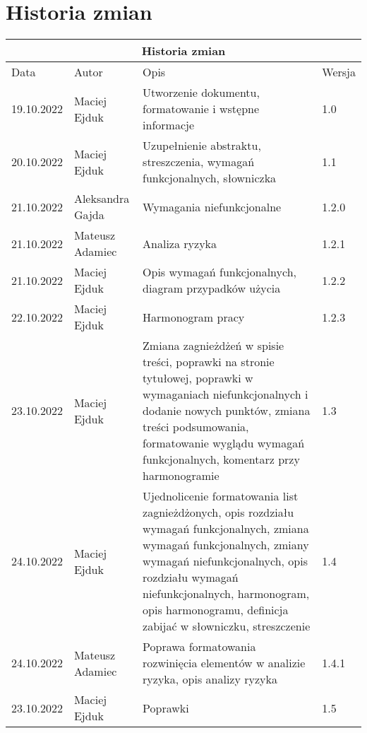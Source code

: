 \chapter{Historia zmian}

\begin{center}
    \begin{longtable}{ |l|l|p{6cm}|l|  }
        \hline
        \multicolumn{4}{|c|}{Historia zmian} \\
        \hline
        Data & Autor & Opis & Wersja\\
        \hline
        19.10.2022 & Maciej Ejduk & Utworzenie dokumentu, formatowanie i wstępne informacje & 1.0\\
        \hline
        20.10.2022 & Maciej Ejduk & Uzupełnienie abstraktu, streszczenia, wymagań funkcjonalnych, słowniczka & 1.1\\
        \hline
        21.10.2022 & Aleksandra Gajda & Wymagania niefunkcjonalne & 1.2.0\\
        \hline
        21.10.2022 & Mateusz Adamiec & Analiza ryzyka & 1.2.1\\
        \hline
        21.10.2022 & Maciej Ejduk & Opis wymagań funkcjonalnych, diagram przypadków użycia & 1.2.2\\
        \hline
        22.10.2022 & Maciej Ejduk & Harmonogram pracy & 1.2.3\\
        \hline
        23.10.2022 & Maciej Ejduk & Zmiana zagnieżdżeń w spisie treści, poprawki na stronie tytułowej, poprawki w wymaganiach niefunkcjonalnych i dodanie nowych punktów, zmiana treści podsumowania, formatowanie wyglądu wymagań funkcjonalnych, komentarz przy harmonogramie & 1.3\\
        \hline
        24.10.2022 & Maciej Ejduk & Ujednolicenie formatowania list zagnieżdżonych, opis rozdziału wymagań funkcjonalnych, zmiana wymagań funkcjonalnych, zmiany wymagań niefunkcjonalnych, opis rozdziału wymagań niefunkcjonalnych, harmonogram, opis harmonogramu, definicja zabijać w słowniczku, streszczenie & 1.4\\
        \hline
        24.10.2022 & Mateusz Adamiec & Poprawa formatowania rozwinięcia elementów w analizie ryzyka, opis analizy ryzyka & 1.4.1\\
        \hline
        23.10.2022 & Maciej Ejduk & Poprawki & 1.5\\
        \hline
    \end{longtable}
\end{center}